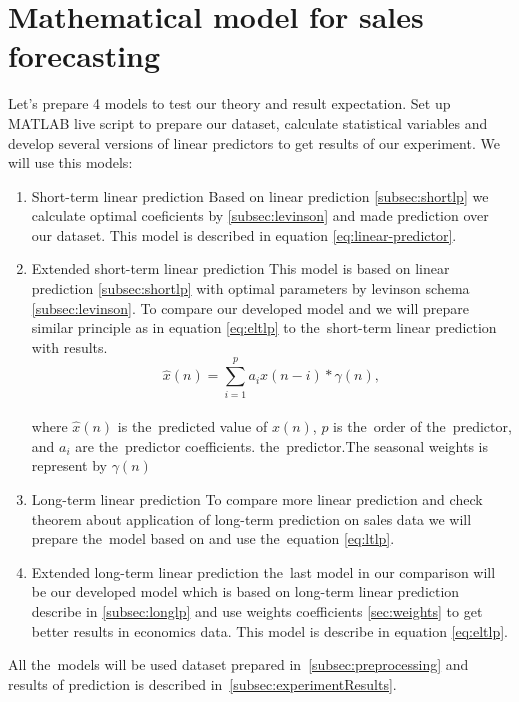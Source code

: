 \section{Mathematical model for sales forecasting}\label{subsec:calculate_models}
Let's prepare 4 models to test our theory and result expectation.  Set up MATLAB live script to prepare our dataset,
calculate statistical variables and develop several versions of linear predictors to get results of our experiment.
We will use this models:
\begin{enumerate}
    \item Short-term linear prediction 
    Based on linear prediction \ref{subsec:shortlp} we calculate optimal coeficients by \ref{subsec:levinson} and
    made prediction over our dataset. This model is described in equation \ref{eq:linear-predictor}.

    \item Extended short-term linear prediction 
    This model is based on linear prediction \ref{subsec:shortlp} with optimal parameters by levinson
    schema \ref{subsec:levinson}. To compare our developed model \label{subsec:extlonglp} and we will prepare
    similar principle as in equation \ref{eq:eltlp} to the~short-term linear prediction with results.
    \begin{equation} \label{eq:slp}
        \hat{x}(n) = \sum_{i=1}^{p} a_i x(n-i) * \gamma(n),
    \end{equation}
    \\
    where $\hat{x}(n)$ is the~predicted value of $x(n)$, $p$ is the~order of the~predictor, and $a_i$ are the~predictor coefficients. the~predictor.The seasonal weights is represent by $\gamma(n)$

    \item Long-term linear prediction 
    To compare more linear prediction and check theorem about application of long-term prediction on sales data
    we will prepare the~model based on \label{subsec:longlp} and use the~equation \ref{eq:ltlp}.

    \item Extended long-term linear prediction
     the~last model in our comparison will be our developed model which is based on long-term linear prediction
    describe in \ref{subsec:longlp} and use weights coefficients \ref{sec:weights} to get better results in
    economics data. This model is describe in equation \ref{eq:eltlp}.
\end{enumerate}
All the~models will be used dataset prepared in~\ref{subsec:preprocessing} and results of prediction is
described in~\ref{subsec:experimentResults}.
